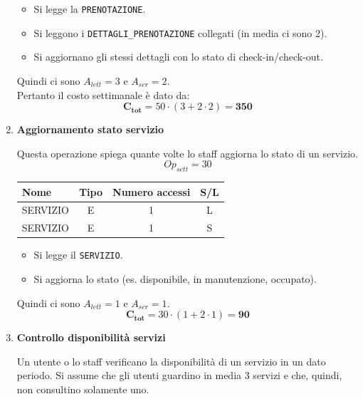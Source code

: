 \documentclass[a4paper,12pt]{report}
\begin{document}
\begin{enumerate}
    \begin{itemize}
      \item Si legge la \texttt{PRENOTAZIONE}.
      \item Si leggono i \texttt{DETTAGLI\_PRENOTAZIONE} collegati (in media ci sono 2).
      \item Si aggiornano gli stessi dettagli con lo stato di check-in/check-out.
    \end{itemize}

    Quindi ci sono $A_{lett}=3$ e $A_{scr}=2$. \\
    Pertanto il costo settimanale è dato da:
    $$
    \mathbf{C_{tot}} = 50 \cdot (3 + 2 \cdot 2) = \mathbf{350}
    $$

	\item {\large \textbf{Aggiornamento stato servizio}} \label{op14}
    
    Questa operazione spiega quante volte lo staff aggiorna lo stato di un servizio.
    $$
    Op_{sett} = 30
    $$

    \begin{table}[H]
    \centering
    \small
    \renewcommand{\arraystretch}{1.15}
    \begin{tabularx}{0.8\textwidth}{|X|c|c|c|}
        \hline
        \rowcolor{gray!20}
        \textbf{Nome} & \textbf{Tipo} & \textbf{Numero accessi} & \textbf{S/L} \\
        \hline
        SERVIZIO & E & 1 & L \\
        SERVIZIO & E & 1 & S \\
        \hline
    \end{tabularx}
    \end{table}

    \begin{itemize}
      \item Si legge il \texttt{SERVIZIO}.
      \item Si aggiorna lo stato (es. disponibile, in manutenzione, occupato).
    \end{itemize}

    Quindi ci sono $A_{lett}=1$ e $A_{scr}=1$. \\
   	$$\mathbf{C_{tot}} = 30 \cdot (1 + 2 \cdot 1) = \mathbf{90}$$

	\item {\large \textbf{Controllo disponibilità servizi}} \label{op15}
    
    Un utente o lo staff verificano la disponibilità di un servizio in un dato periodo.
    Si assume che gli utenti guardino in media 3 servizi e che, quindi, non consultino solamente uno.
    

\end{enumerate}
\end{document}
